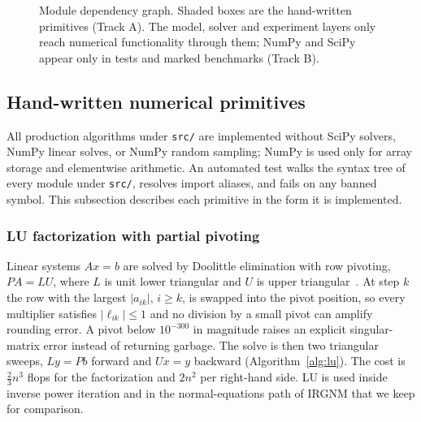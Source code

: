 \documentclass[sigconf,nonacm]{acmart}
\begin{document}
\begin{figure}[t]
{}
  \caption{Module dependency graph. Shaded boxes are the hand-written primitives (Track A). The model, solver and experiment layers only reach numerical functionality through them; NumPy and SciPy appear only in tests and marked benchmarks (Track B).}
  \label{fig:architecture}
\end{figure}

\subsection{Hand-written numerical primitives}

All production algorithms under \texttt{src/} are implemented without SciPy solvers, NumPy linear solves, or NumPy random sampling; NumPy is used only for array storage and elementwise arithmetic. An automated test walks the syntax tree of every module under \texttt{src/}, resolves import aliases, and fails on any banned symbol. This subsection describes each primitive in the form it is implemented.

\subsubsection{LU factorization with partial pivoting}
Linear systems $Ax=b$ are solved by Doolittle elimination with row pivoting, $PA=LU$, where $L$ is unit lower triangular and $U$ is upper triangular~\cite{golub2013,chapra2015}. At step $k$ the row with the largest $|a_{ik}|$, $i\ge k$, is swapped into the pivot position, so every multiplier satisfies $|\ell_{ik}|\le1$ and no division by a small pivot can amplify rounding error. A pivot below $10^{-300}$ in magnitude raises an explicit singular-matrix error instead of returning garbage. The solve is then two triangular sweeps, $Ly=Pb$ forward and $Ux=y$ backward (Algorithm~\ref{alg:lu}). The cost is $\tfrac23n^3$ flops for the factorization and $2n^2$ per right-hand side. LU is used inside inverse power iteration and in the normal-equations path of IRGNM that we keep for comparison.
\end{document}
